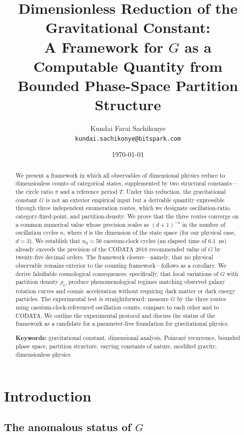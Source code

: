 \documentclass[11pt,twocolumn,a4paper]{article}
\title{\textbf{Dimensionless Reduction of the Gravitational Constant: \\
A Framework for $G$ as a Computable Quantity from \\
Bounded Phase-Space Partition Structure}}
\author{Kundai Farai Sachikonye\\
\texttt{kundai.sachikonye@bitspark.com}}
\date{\today}
\theoremstyle{definition}
\theoremstyle{remark}
\newcommand{\Gnewton}{G}
\begin{document}
\maketitle

\begin{abstract}
We present a framework in which all observables of dimensional physics reduce to dimensionless counts of categorical states, supplemented by two structural constants---the circle ratio $\pi$ and a reference period $T$. Under this reduction, the gravitational constant $\Gnewton$ is not an exterior empirical input but a derivable quantity expressible through three independent enumeration routes, which we designate oscillation-ratio, category-fixed-point, and partition-density. We prove that the three routes converge on a common numerical value whose precision scales as ${(d+1)}^{-n}$ in the number of oscillation cycles $n$, where $d$ is the dimension of the state space (for our physical case, $d=3$). We establish that $n_0 = 56$ caesium-clock cycles (an elapsed time of $6.1$~ns) already exceeds the precision of the CODATA 2018 recommended value of $\Gnewton$ by twenty-five decimal orders. The framework closure---namely, that no physical observable remains exterior to the counting framework---follows as a corollary. We derive falsifiable cosmological consequences: specifically, that local variations of $\Gnewton$ with partition density $\rho_C$ produce phenomenological regimes matching observed galaxy rotation curves and cosmic acceleration without requiring dark matter or dark energy particles. The experimental test is straightforward: measure $\Gnewton$ by the three routes using caesium-clock-referenced oscillation counts, compare to each other and to CODATA\@. We outline the experimental protocol and discuss the status of the framework as a candidate for a parameter-free foundation for gravitational physics.
\medskip

\noindent\textbf{Keywords:} gravitational constant, dimensional analysis, Poincar\'e recurrence, bounded phase space, partition structure, varying constants of nature, modified gravity, dimensionless physics
\end{abstract}

\section{Introduction}
\label{sec:intro}

\subsection{The anomalous status of $\Gnewton$}
\end{document}
